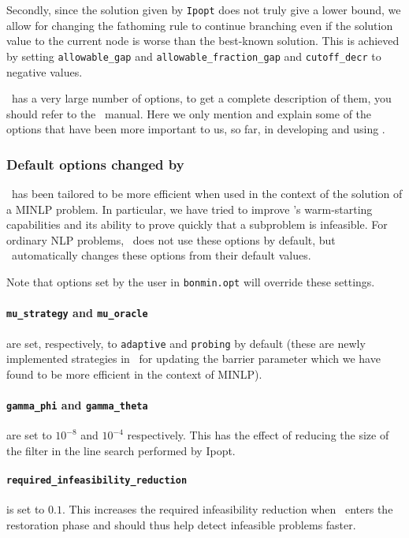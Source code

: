 Secondly, since the solution given by {\tt Ipopt} does not truly give a lower bound, we allow for
changing the fathoming rule
to continue branching even if the solution value to the current node is worse
than the best-known
solution. This is achieved by setting {\tt allowable\_gap}
and {\tt allowable\_fraction\_gap} and {\tt cutoff\_decr} to negative values.

\Ipopt\ has a very large number of options, to get a complete description of them, you
should refer to the \Ipopt\ manual.
Here we only mention and explain some of the options that have been more important to us, so far,
in developing and using \Bonmin.
\subsubsection{Default options changed by \Bonmin}
\Ipopt\ has been tailored to be more efficient when used in the context of the
solution of a MINLP problem. In particular, we have tried to
improve \Ipopt's warm-starting capabilities and its ability to prove quickly that a subproblem
is infeasible. For ordinary NLP problems, \Ipopt\ does not use these options
by default, but \Bonmin\ automatically changes these options from their default values.

Note that options set by the user in {\tt bonmin.opt} will override these
settings.

\paragraph{{\tt mu\_strategy} and {\tt mu\_oracle}} are set, respectively, to
{\tt adaptive} and {\tt probing} by default (these are newly implemented strategies in \Ipopt\
for updating the barrier parameter \cite{NocedalAdaptive} which we have found to be
more efficient in the context of MINLP).
\paragraph{{\tt gamma\_phi} and {\tt gamma\_theta}} are set to $10^{-8}$ and $10^{-4}$
respectively. This has the effect of reducing the size of the filter in the line search performed by Ipopt.

\paragraph{\tt required\_infeasibility\_reduction} is set to $0.1$.
This increases the required infeasibility reduction when \Ipopt\ enters the
restoration phase and should thus help
detect infeasible problems faster.

